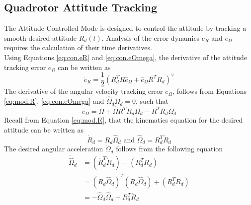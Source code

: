 
\subsection{Quadrotor Attitude Tracking}\label{sec:con.qratt}
The  Attitude Controlled Mode is designed to control the  attitude by tracking a smooth desired  attitude $ R_d(t) $.  
Analysis of the error dynamics $ e_R $ and $ e_\Omega $ requires the calculation of their time derivatives.\\
Using Equations \ref{eq:con.eR} and \ref{eq:con.eOmega}, the derivative of the attitude tracking error $ e_R $ can be written as
\begin{equation}\label{key}
\dot{e}_R=\frac{1}{2}(R_d^TR\hat{e}_\Omega+\hat{e}_\Omega R^TR_d)^\vee
\end{equation}
The derivative of the angular velocity tracking error $ e_\Omega $, follows from Equations \ref{eq:mod.R}, \ref{eq:con.eOmega} and $ \hat{\Omega}_d\Omega_d =0$, such that
\begin{equation}\label{eq:con.deOmega}
\dot{e}_\Omega=\dot{\Omega}+\hat{\Omega}R^TR_d\Omega_d-R^TR_d\dot{\Omega}_d
\end{equation}
Recall from Equation \ref{eq:mod.R}, that the kinematics equation for the desired attitude can be written as
\begin{equation}\label{eq:con.dotRd}
\dot{R}_d=R_d\hat{\Omega}_d \text{ and } \hat{\Omega}_d=R_d^T\dot{R}_d
\end{equation}
The desired angular acceleration $ \dot{\Omega}_d $ follows from the following equation
\begin{equation}
\begin{aligned}
\dot{\hat{\Omega}}_d&=(\dot{R}_d^T\dot{R}_d)+(R_d^T\ddot{R}_d)\\
&=(R_d\hat{\Omega}_d)^T(R_d\hat{\Omega}_d)+(R_d^T\ddot{R}_d)\\
&=-\hat{\Omega}_d\hat{\Omega}_d+R_d^T\ddot{R}_d
\end{aligned}
\end{equation}
